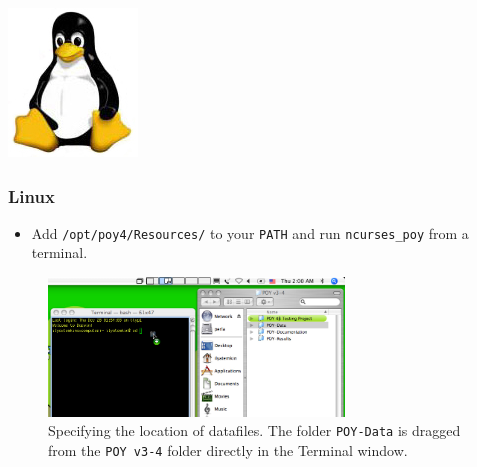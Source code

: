 \begin{flushleft}
	\begin{minipage}[c]{0.075\textwidth}
   		\includegraphics[width=\textwidth]{doc/figures/figlogolinux.jpg}
	\end{minipage}
	\quad
	\begin{minipage}[t]{0.89\textwidth}
	   	\subsubsection{Linux}
	\end{minipage}
	\begin{itemize}
    		\item Add \texttt{/opt/poy4/Resources/} to your \texttt{PATH} and run
    \texttt{ncurses\_poy} from a terminal.
    	\end{itemize}
\end{flushleft}

\begin{figure}[htbp]
   \centering
   \includegraphics[width=0.7\textwidth]{doc/figures/figprelim1.jpg}
   \caption{Specifying the location of datafiles. The folder \texttt{POY-Data} is dragged from the \texttt{POY v3-4} folder directly in the Terminal window.}
   \label{fig:figprelim1}
\end{figure}

